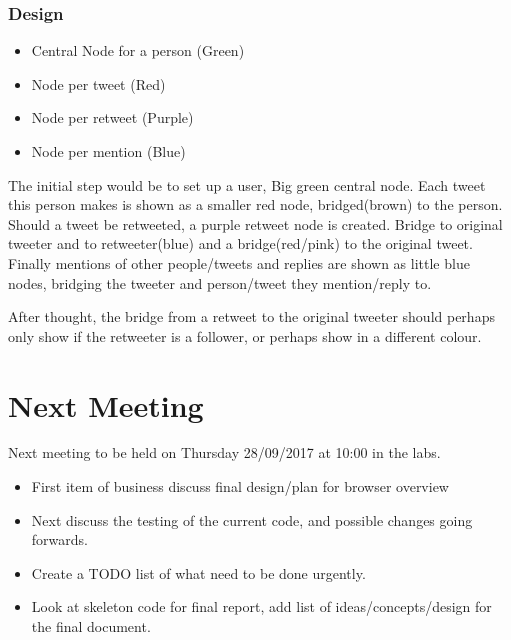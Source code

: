 \documentclass[11pt]{article}
\begin{document}
\subsubsection{Design}
\begin{itemize}
\item Central Node for a person (Green)
\item Node per tweet (Red)
\item Node per retweet (Purple)
\item Node per mention (Blue)
\end{itemize}

The initial step would be to set up a user, Big green central node.
Each tweet this person makes is shown as a smaller red node, bridged(brown) to the person.
Should a tweet be retweeted, a purple retweet node is created. Bridge to original tweeter and to retweeter(blue) and a bridge(red/pink) to the original tweet.
Finally mentions of other people/tweets and replies are shown as little blue nodes, bridging the tweeter and person/tweet they mention/reply to. 

After thought, the bridge from a retweet to the original tweeter should perhaps only show if the retweeter is a follower, or perhaps show in a different colour.

\section{Next Meeting}
Next meeting to be held on Thursday 28/09/2017 at 10:00 in the labs. 
\begin{itemize}
\item First item of business discuss final design/plan for browser overview 
\item Next discuss the testing of the current code, and possible changes going forwards. 
\item Create a TODO list of what need to be done urgently.
\item Look at skeleton code for final report, add list of ideas/concepts/design for the final document.
\end{itemize}
	
\end{document}
